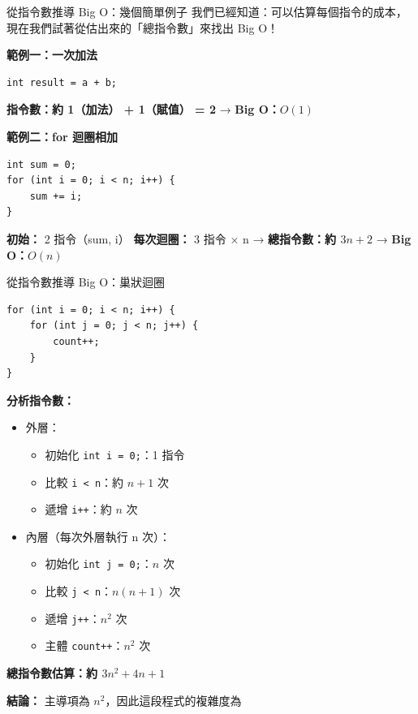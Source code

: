 \documentclass{beamer}
\begin{document}
\begin{frame}[fragile]{從指令數推導 Big O：幾個簡單例子}
我們已經知道：可以估算每個指令的成本，  
現在我們試著從估出來的「總指令數」來找出 Big O！

\vspace{1em}
\textbf{範例一：一次加法}
\begin{lstlisting}[style=cppstyle]
int result = a + b;
\end{lstlisting}
\textbf{指令數：約 1（加法） + 1（賦值） = 2}  
→ \textbf{Big O：$O(1)$}

\vspace{0.5em}
\textbf{範例二：for 迴圈相加}
\begin{lstlisting}[style=cppstyle]
int sum = 0;
for (int i = 0; i < n; i++) {
    sum += i;
}
\end{lstlisting}
\textbf{初始：} 2 指令（sum, i）  
\textbf{每次迴圈：} 3 指令 × n  
→ \textbf{總指令數：約 $3n + 2$}  
→ \textbf{Big O：$O(n)$}
\end{frame}

\begin{frame}[fragile]{從指令數推導 Big O：巢狀迴圈}
\begin{lstlisting}[style=cppstyle]
for (int i = 0; i < n; i++) {
    for (int j = 0; j < n; j++) {
        count++;
    }
}
\end{lstlisting}

\vspace{0.1em}
\textbf{分析指令數：}
\begin{itemize}
    \item 外層：
    \begin{itemize}
        \item 初始化 \texttt{int i = 0;}：1 指令
        \item 比較 \texttt{i < n}：約 $n + 1$ 次
        \item 遞增 \texttt{i++}：約 $n$ 次
    \end{itemize}
    \item 內層（每次外層執行 n 次）：
    \begin{itemize}
        \item 初始化 \texttt{int j = 0;}：$n$ 次
        \item 比較 \texttt{j < n}：$n(n + 1)$ 次
        \item 遞增 \texttt{j++}：$n^2$ 次
        \item 主體 \texttt{count++}：$n^2$ 次
    \end{itemize}
\end{itemize}

\vspace{0.1em}
\textbf{總指令數估算：約 $3n^2 + 4n + 1$}

\vspace{0.1em}
\textbf{結論：} 主導項為 $n^2$，因此這段程式的複雜度為 
\end{frame}
\end{document}
